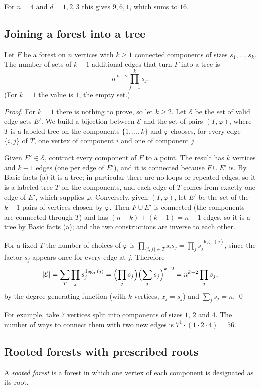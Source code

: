 \documentclass[11pt]{article}
\begin{document}
For $n=4$ and $d=1,2,3$ this gives $9,6,1$, which sums to $16$.

\subsection{Joining a forest into a tree}
\begin{theorembox}
Let $F$ be a forest on $n$ vertices with $k\ge 1$ connected components of
sizes $s_1,\dots,s_k$. The number of sets of $k-1$ additional edges that
turn $F$ into a tree is
\[
  n^{\,k-2}\prod_{j=1}^{k}s_j .
\]
(For $k=1$ the value is $1$, the empty set.)

\emph{Proof.} For $k=1$ there is nothing to prove, so let $k\ge2$.
Let $\mathcal E$ be the set of valid edge sets $E'$. We build a bijection
between $\mathcal E$ and the set of pairs $(T,\varphi)$, where $T$ is a
labeled tree on the components $\{1,\dots,k\}$ and $\varphi$ chooses, for
every edge $\{i,j\}$ of $T$, one vertex of component $i$ and one of
component $j$.

Given $E'\in\mathcal E$, contract every component of $F$ to a point. The
result has $k$ vertices and $k-1$ edges (one per edge of $E'$), and it is
connected because $F\cup E'$ is. By Basic facts (a) it is a tree; in
particular there are no loops or repeated edges, so it is a labeled tree
$T$ on the components, and each edge of $T$ comes from exactly one edge of
$E'$, which supplies $\varphi$. Conversely, given $(T,\varphi)$, let $E'$
be the set of the $k-1$ pairs of vertices chosen by $\varphi$. Then
$F\cup E'$ is connected (the components are connected through $T$) and has
$(n-k)+(k-1)=n-1$ edges, so it is a tree by Basic facts (a); and the two
constructions are inverse to each other.

For a fixed $T$ the number of choices of $\varphi$ is
$\prod_{\{i,j\}\in T}s_is_j=\prod_j s_j^{\deg_T(j)}$, since the factor
$s_j$ appears once for every edge at $j$. Therefore
\[
  |\mathcal E|=\sum_T\prod_j s_j^{\deg_T(j)}
  =\Bigl(\prod_j s_j\Bigr)\Bigl(\sum_j s_j\Bigr)^{k-2}
  = n^{k-2}\prod_j s_j,
\]
by the degree generating function (with $k$ vertices, $x_j=s_j$) and
$\sum_js_j=n$. \qed
\end{theorembox}

For example, take $7$ vertices split into components of sizes $1$, $2$ and
$4$. The number of ways to connect them with two new edges is
$7^{1}\cdot(1\cdot2\cdot4)=56$.

\subsection{Rooted forests with prescribed roots}
A \emph{rooted forest} is a forest in which one vertex of each component
is designated as its root.
\end{document}
